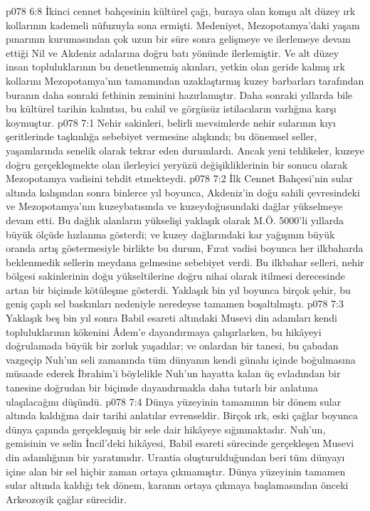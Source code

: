 \vs p078 6:8 İkinci cennet bahçesinin kültürel çağı, buraya olan komşu alt düzey ırk kollarının kademeli nüfuzuyla sona ermişti. Medeniyet, Mezopotamya’daki yaşam pınarının kurumasından çok uzun bir süre sonra gelişmeye ve ilerlemeye devam ettiği Nil ve Akdeniz adalarına doğru batı yönünde ilerlemiştir. Ve alt düzey insan topluluklarının bu denetlenmemiş akınları, yetkin olan geride kalmış ırk kollarını Mezopotamya’nın tamamından uzaklaştırmış kuzey barbarları tarafından buranın daha sonraki fethinin zeminini hazırlamıştır. Daha sonraki yıllarda bile bu kültürel tarihin kalıntısı, bu cahil ve görgüsüz istilacıların varlığına karşı koymuştur.
\vs p078 7:1 Nehir sakinleri, belirli mevsimlerde nehir sularının kıyı şeritlerinde taşkınlığa sebebiyet vermesine alışkındı; bu dönemsel seller, yaşamlarında senelik olarak tekrar eden durumlardı. Ancak yeni tehlikeler, kuzeye doğru gerçekleşmekte olan ilerleyici yeryüzü değişikliklerinin bir sonucu olarak Mezopotamya vadisini tehdit etmekteydi.
\vs p078 7:2 İlk Cennet Bahçesi’nin sular altında kalışından sonra binlerce yıl boyunca, Akdeniz’in doğu sahili çevresindeki ve Mezopotamya’nın kuzeybatısında ve kuzeydoğusundaki dağlar yükselmeye devam etti. Bu dağlık alanların yükselişi yaklaşık olarak M.Ö. 5000’li yıllarda büyük ölçüde hızlanma gösterdi; ve kuzey dağlarındaki kar yağışının büyük oranda artış göstermesiyle birlikte bu durum, Fırat vadisi boyunca her ilkbaharda beklenmedik sellerin meydana gelmesine sebebiyet verdi. Bu ilkbahar selleri, nehir bölgesi sakinlerinin doğu yükseltilerine doğru nihai olarak itilmesi derecesinde artan bir biçimde kötüleşme gösterdi. Yaklaşık bin yıl boyunca birçok şehir, bu geniş çaplı sel baskınları nedeniyle neredeyse tamamen boşaltılmıştı.
\vs p078 7:3 Yaklaşık beş bin yıl sonra Babil esareti altındaki Musevi din adamları kendi topluluklarının kökenini Âdem’e dayandırmaya çalışırlarken, bu hikâyeyi doğrulamada büyük bir zorluk yaşadılar; ve onlardan bir tanesi, bu çabadan vazgeçip Nuh’un seli zamanında tüm dünyanın kendi günahı içinde boğulmasına müsaade ederek İbrahim’i böylelikle Nuh’un hayatta kalan üç evladından bir tanesine doğrudan bir biçimde dayandırmakla daha tutarlı bir anlatıma ulaşılacağını düşündü.
\vs p078 7:4 Dünya yüzeyinin tamamının bir dönem sular altında kaldığına dair tarihi anlatılar evrenseldir. Birçok ırk, eski çağlar boyunca dünya çapında gerçekleşmiş bir sele dair hikâyeye sığınmaktadır. Nuh’un, gemisinin ve selin İncil’deki hikâyesi, Babil esareti sürecinde gerçekleşen Musevi din adamlığının bir yaratımıdır. Urantia oluşturulduğundan beri tüm dünyayı içine alan bir sel hiçbir zaman ortaya çıkmamıştır. Dünya yüzeyinin tamamen sular altında kaldığı tek dönem, karanın ortaya çıkmaya başlamasından önceki Arkeozoyik çağlar sürecidir.
